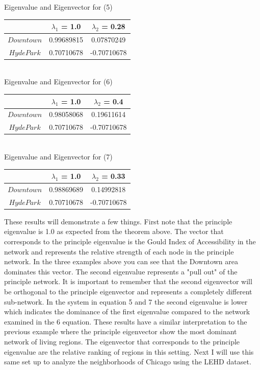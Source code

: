 \documentclass{article}
\theoremstyle{definition}
\theoremstyle{remark}
\begin{document}
\begin{center}
Eigenvalue and Eigenvector for (5) \\
\begin{tabular}{||c | c c ||} 
 \hline
 & $\lambda_1$ = 1.0 & $\lambda_2$ = 0.28\\[0.5ex] 
 \hline\hline
 $Downtown$ & 0.99689815 & 0.07870249 \\
 $Hyde Park$ & 0.70710678 & -0.70710678  \\ 
 \hline
 \end{tabular} \\ 
Eigenvalue and Eigenvector for (6) \\
\begin{tabular}{||c | c c ||} 
 \hline
 & $\lambda_1$ = 1.0 & $\lambda_2$ = 0.4\\[0.5ex] 
 \hline\hline
 $Downtown$ & 0.98058068 & 0.19611614 \\
 $Hyde Park$ & 0.70710678 & -0.70710678  \\ 
 \hline
 \end{tabular} \\ 
Eigenvalue and Eigenvector for (7) \\
\begin{tabular}{||c | c c ||} 
 \hline
 & $\lambda_1$ = 1.0 & $\lambda_2$ = 0.33\\[0.5ex] 
 \hline\hline
 $Downtown$ & 0.98869689 & 0.14992818 \\
 $Hyde Park$ & 0.70710678 & -0.70710678  \\ 
 \hline
 \end{tabular}
 \end{center}

These results will demonstrate a few things.  First note that the principle eigenvalue is 1.0 as expected from the theorem above.  The vector that corresponds to the principle eigenvalue is the Gould Index of Accessibility in the network and represents the relative strength of each node in the principle network.  In the three examples above you can see that the Downtown area dominates this vector.  The second eigenvalue represents a "pull out" of the principle network.  It is important to remember that the second eigenvector will be orthogonal to the principle eigenvector and represents a completely different sub-network.  In the system in equation 5 and 7 the second eigenvalue is lower which indicates the dominance of the first eigenvalue compared to the network examined in the 6 equation.  These results have a similar interpretation to the previous example where the principle eigenvector show the most dominant network of living regions.  The eigenvector that corresponds to the principle eigenvalue are the relative ranking of regions in this setting.  Next I will use this same set up to analyze the neighborhoods of Chicago using the LEHD dataset.
\end{document}
